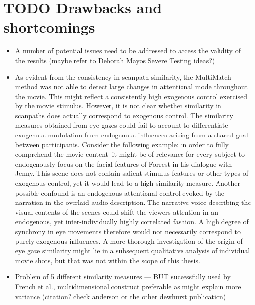 \documentclass[a4paper, 12pt]{scrreprt}
\begin{document}
\section{TODO Drawbacks and shortcomings}
\begin{itemize}
	\item A number of potential issues need to be addressed to access the validity of the results (maybe refer to Deborah Mayos Severe Testing ideas?)
	\item As evident from the consistency in scanpath similarity, the MultiMatch method was not able to detect large changes in attentional mode throughout the movie. This might reflect a consistently high exogenous control exercised by the movie stimulus. However, it is not clear whether similarity in scanpaths does actually correspond to exogenous control. The similarity measures obtained from eye gazes could fail to account to differentiate exogenous modulation from endogenous influences arising from a shared goal between participants. Consider the following example: in order to fully comprehend the movie content, it might be of relevance for every subject to endogenously focus on the facial features of Forrest in his dialogue with Jenny. This scene does not contain salient stimulus features or other types of exogenous control, yet it would lead to a high similarity measure. Another possible confound is an endogenous attentional control evoked by the narration in the overlaid audio-description. The narrative voice describing the visual contents of the scenes could shift the viewers attention in an endogenous, yet inter-individually highly correlated fashion. A high degree of synchrony in eye movements therefore would not necessarily correspond to purely exogenous influences. A more thorough investigation of the origin of eye gaze similarity might lie in a subsequent qualitative analysis of individual movie shots, but that was not within the scope of this thesis.
	\item Problem of 5 different similarity measures --- BUT successfully used by French et al., multidimensional construct preferable as might explain more variance (citation? check anderson or the other dewhurst publication) 

\end{itemize}
\end{document}
